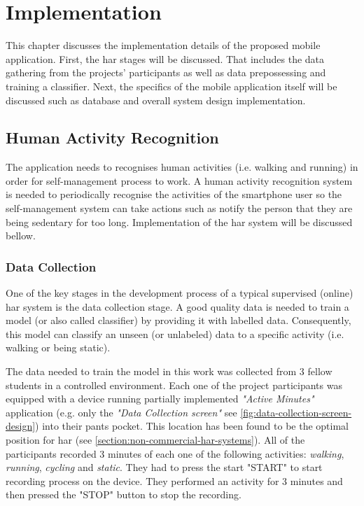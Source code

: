 \chapter{Implementation}
This chapter discusses the implementation details of the proposed mobile application. First, the \gls{har} stages will be discussed. That includes the data gathering from the projects' participants as well as data prepossessing and training a classifier. Next, the specifics of the mobile application itself will be discussed such as database and overall system design implementation.


\section{Human Activity Recognition}
The application needs to recognises human activities (i.e. walking and running) in order for self-management process to work. A human activity recognition system is needed to periodically recognise the activities of the smartphone user so the self-management system can take actions such as notify the person that they are being sedentary for too long. Implementation of the \gls{har} system will be discussed bellow.

    \subsection{Data Collection}
    One of the key stages in the development process of a typical supervised (online) \gls{har} system is the data collection stage. A good quality data is needed to train a model (or also called classifier) by providing it with labelled data. Consequently, this model can classify an unseen (or unlabeled) data to a specific activity (i.e. walking or being static).
    
    The data needed to train the model in this work was collected from 3 fellow students in a controlled environment. Each one of the project participants was equipped with a device running partially implemented \textit{"Active Minutes"} application (e.g. only the \textit{"Data Collection screen"} see \ref{fig:data-collection-screen-design}) into their pants pocket. This location has been found to be the optimal position for \gls{har} (see \ref{section:non-commercial-har-systems}). All of the participants recorded 3 minutes of each one of the following activities: \textit{walking}, \textit{running}, \textit{cycling} and \textit{static}. They had to press the start "START" to start recording process on the device. They performed an activity for 3 minutes and then pressed the "STOP" button to stop the recording.
    
